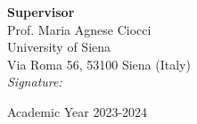 \begin{titlepage}
\noindent
\textbf{Supervisor}\\
Prof. Maria Agnese Ciocci\\
University of Siena\\
Via Roma 56, 53100 Siena (Italy)\\

\hspace{4cm} \textit{Signature:}\\
\vspace{5mm}

\vfill
\begin{center}
    \large Academic Year 2023-2024
    \end{center}



\end{titlepage}
\restoregeometry
